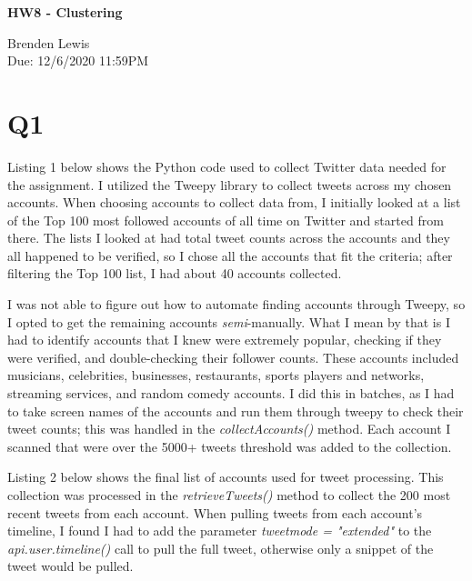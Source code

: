 \documentclass[12pt]{article}
\begin{document}
\begin{centering}
{\large\textbf{HW8 - Clustering}}

Brenden Lewis\\                     
Due: 12/6/2020 11:59PM\\                      
\end{centering}

\section*{Q1}
Listing 1 below shows the Python code used to collect Twitter data needed for the assignment. I utilized the Tweepy library to collect tweets across my chosen accounts. When choosing accounts to collect data from, I initially looked at a list of the Top 100 most followed accounts of all time on Twitter and started from there. The lists I looked at had total tweet counts across the accounts and they all happened to be verified, so I chose all the accounts that fit the criteria; after filtering the Top 100 list, I had about 40 accounts collected. 

\par I was not able to figure out how to automate finding accounts through Tweepy, so I opted to get the remaining accounts \emph{semi}-manually. What I mean by that is I had to identify accounts that I knew were extremely popular, checking if they were verified, and double-checking their follower counts. These accounts included musicians, celebrities, businesses, restaurants, sports players and networks, streaming services, and random comedy accounts. I did this in batches, as I had to take screen names of the accounts and run them through tweepy to check their tweet counts; this was handled in the \emph{collectAccounts()} method. Each account I scanned that were over the 5000+ tweets threshold was added to the collection.  



Listing 2 below shows the final list of accounts used for tweet processing. This collection was processed in the \emph{retrieveTweets()} method to collect the 200 most recent tweets from each account. When pulling tweets from each account's timeline, I found I had to add the parameter \emph{tweet\textunderscore mode = "extended"} to the \emph{api.user.timeline()} call to pull the full tweet, otherwise only a snippet of the tweet would be pulled.
\end{document}
